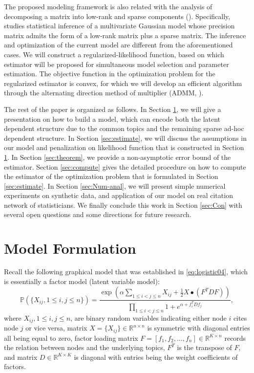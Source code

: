 \documentclass[AMS,STIX1COL]{WileyNJD-v2}
\begin{document}
{The proposed modeling framework is also related with the analysis of decomposing a matrix into low-rank and sparse components (\cite{agarwal2012noisy,candes2011robust,chandrasekaran2010latent, zhou2010stable}).
Specifically, \cite{chandrasekaran2010latent} studies statistical inference of a multivariate Gaussian model whose precision matrix admits the form of a low-rank matrix plus a sparse matrix.
The inference and optimization of the current model are different from the aforementioned cases.
We will construct a regularized-likelihood function, based on which estimator will be proposed for simultaneous model selection and parameter estimation.
The objective function in the optimization problem for the regularized estimator is convex, for which we will develop an efficient algorithm through the alternating direction method of multiplier (ADMM, \cite{boyd2011distributed, gabay1975dual, glowinski1975solution}).

The rest of the paper is organized as follows.
In Section \ref{sec:model-form}, we will give a presentation on how to build a model, which can encode both the latent dependent structure due to the common topics and the remaining sparse ad-hoc dependent structure.
In Section \ref{sec:estimate}, we will discuss the assumptions in our model and penalization on likelihood function that is constructed in Section \ref{sec:model-form}.
In Section \ref{sec:theorem}, we provide a non-asymptotic error bound of the estimator.
Section \ref{sec:compute} gives the detailed procedure on how to compute the estimator of the optimization problem that is formulated in Section \ref{sec:estimate}.
In Section \ref{sec:Num-anal}, we will present simple numerical experiments on synthetic data, and application of our model on real citation network of statisticians.
We finally conclude this work in Section \ref{sec:Con} with several open questions and some directions for future research.

\section{Model Formulation}
\label{sec:model-form}

Recall the following graphical model that was established in \eqref{eq:logistic04}, which is essentially a factor model (latent variable model):
$$
\mathbb{P}\left(\{X_{ij}, 1\le i,j \le n\}\right)
= \frac{\exp\left(\alpha \sum_{1\le i< j\le n}X_{ij} +\frac{1}{2} X \bullet (F^T D F)\right)}{\prod_{1\le i<j \le n}  1 + e^{\alpha + f_i^T D f_j }},
$$
where
$X_{ij}, 1\le i,j \le n$, are binary random variables indicating either node $i$ cites node $j$ or vice versa,
matrix $X = \{X_{ij}\} \in \mathbb{R}^{n \times n}$ is symmetric with diagonal entries all being equal to zero,
factor loading matrix $F = [f_1,f_2,\ldots,f_n]\in \mathbb{R}^{K\times n}$ records the relation between nodes and the underlying topics, $F^T$ is the transpose of $F$,
and matrix $D \in \mathbb{R}^{K \times K}$  is diagonal with entries being the weight coefficients of factors.

}
\end{document}
